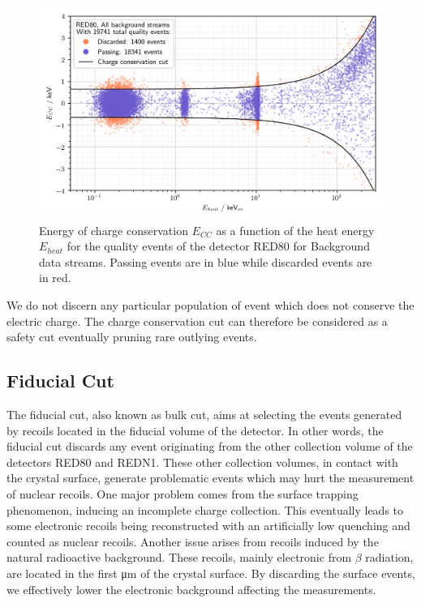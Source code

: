 \begin{figure}
\centering
\includegraphics[width=\linewidth,]{Figures/Neutron/charge_conservation.png}
\caption{Energy of charge conservation $E_{CC}$ as a function of the heat energy $E_{heat}$ for the quality events of the detector RED80 for Background data streams. Passing events are in blue while discarded events are in red.}
\label{fig:charge-conservation}
\end{figure}

We do not discern any particular population of event which does not conserve the electric charge. The charge conservation cut can therefore be considered as a safety cut eventually pruning rare outlying events.


\subsection{Fiducial Cut}
\label{par:fiducial-cut}
\label{par:bulk-cut}

The fiducial cut, also known as bulk cut, aims at selecting the events generated by recoils located in the fiducial volume of the detector. In other words, the fiducial cut discards any event originating from the other collection volume of the detectors RED80 and REDN1. These other collection volumes, in contact with the crystal surface, generate problematic events which may hurt the measurement of nuclear recoils.
One major problem comes from the surface trapping phenomenon, inducing an incomplete charge collection. This eventually leads to some electronic recoils being reconstructed with an artificially low quenching and counted as nuclear recoils.
Another issue arises from recoils induced by the natural radioactive background. These recoils, mainly electronic from $\beta$ radiation, are located in the first \si{\micro\meter} of the crystal surface. By discarding the surface events, we effectively lower the electronic background affecting the measurements.

